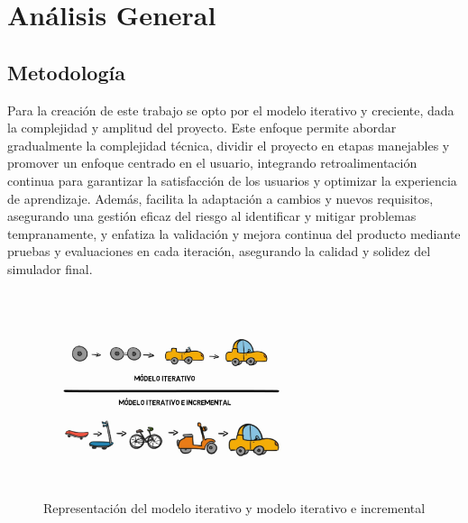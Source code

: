 \chapter{Análisis General}\label{ch:Análisis_General}

\section{Metodología}
Para la creación de este trabajo se opto por el modelo iterativo y creciente, dada la complejidad y amplitud del proyecto. Este enfoque permite abordar gradualmente la complejidad técnica, dividir el proyecto en etapas manejables y promover un enfoque centrado en el usuario, integrando retroalimentación continua para garantizar la satisfacción de los usuarios y optimizar la experiencia de aprendizaje. Además, facilita la adaptación a cambios y nuevos requisitos, asegurando una gestión eficaz del riesgo al identificar y mitigar problemas tempranamente, y enfatiza la validación y mejora continua del producto mediante pruebas y evaluaciones en cada iteración, asegurando la calidad y solidez del simulador final.

\begin{figure}[thbp]
    \centering
    \includegraphics[width=0.7\textwidth, height = 6cm]{img/chapter03/iterativo incremental.jpg}
    \caption{Representación del modelo iterativo y modelo iterativo e incremental}
    \label{fig:iterativo_incremental}
\end{figure}

